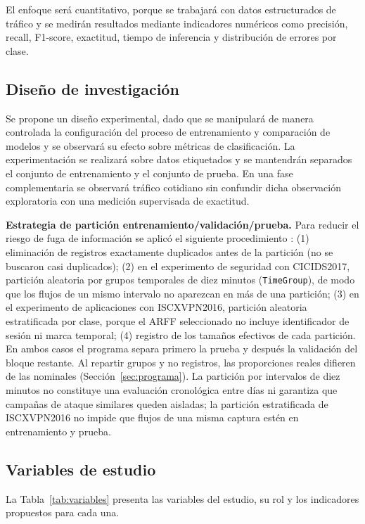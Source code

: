 \documentclass[conference]{IEEEtran}
\begin{document}
El enfoque será cuantitativo, porque se trabajará con datos estructurados de tráfico y se medirán resultados mediante indicadores numéricos como precisión, recall, F1-score, exactitud, tiempo de inferencia y distribución de errores por clase.

\subsection{Diseño de investigación}
Se propone un diseño experimental, dado que se manipulará de manera controlada la configuración del proceso de entrenamiento y comparación de modelos y se observará su efecto sobre métricas de clasificación. La experimentación se realizará sobre datos etiquetados y se mantendrán separados el conjunto de entrenamiento y el conjunto de prueba. En una fase complementaria se observará tráfico cotidiano sin confundir dicha observación exploratoria con una medición supervisada de exactitud.

\textbf{Estrategia de partición entrenamiento/validación/prueba.} Para reducir el riesgo de fuga de información se aplicó el siguiente procedimiento \cite{arp2022}: (1) eliminación de registros exactamente duplicados antes de la partición (no se buscaron casi duplicados); (2) en el experimento de seguridad con CICIDS2017, partición aleatoria por grupos temporales de diez minutos (\texttt{TimeGroup}), de modo que los flujos de un mismo intervalo no aparezcan en más de una partición; (3) en el experimento de aplicaciones con ISCXVPN2016, partición aleatoria estratificada por clase, porque el ARFF seleccionado no incluye identificador de sesión ni marca temporal; (4) registro de los tamaños efectivos de cada partición. En ambos casos el programa separa primero la prueba y después la validación del bloque restante. Al repartir grupos y no registros, las proporciones reales difieren de las nominales (Sección~\ref{sec:programa}). La partición por intervalos de diez minutos no constituye una evaluación cronológica entre días ni garantiza que campañas de ataque similares queden aisladas; la partición estratificada de ISCXVPN2016 no impide que flujos de una misma captura estén en entrenamiento y prueba.


\subsection{Variables de estudio}

La Tabla~\ref{tab:variables} presenta las variables del estudio, su rol y los indicadores propuestos para cada una.
\end{document}
